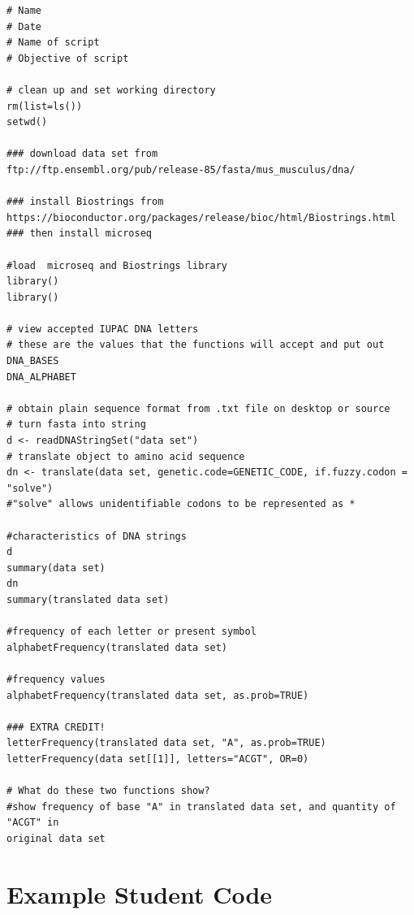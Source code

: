 \begin{lstlisting}
# Name
# Date
# Name of script
# Objective of script

# clean up and set working directory
rm(list=ls()) 
setwd()

### download data set from
ftp://ftp.ensembl.org/pub/release-85/fasta/mus_musculus/dna/

### install Biostrings from
https://bioconductor.org/packages/release/bioc/html/Biostrings.html
### then install microseq

#load  microseq and Biostrings library
library()
library()

# view accepted IUPAC DNA letters
# these are the values that the functions will accept and put out
DNA_BASES
DNA_ALPHABET

# obtain plain sequence format from .txt file on desktop or source
# turn fasta into string
d <- readDNAStringSet("data set")
# translate object to amino acid sequence
dn <- translate(data set, genetic.code=GENETIC_CODE, if.fuzzy.codon = "solve") 
#"solve" allows unidentifiable codons to be represented as *

#characteristics of DNA strings
d
summary(data set)
dn
summary(translated data set)

#frequency of each letter or present symbol
alphabetFrequency(translated data set)

#frequency values
alphabetFrequency(translated data set, as.prob=TRUE)

### EXTRA CREDIT!
letterFrequency(translated data set, "A", as.prob=TRUE)
letterFrequency(data set[[1]], letters="ACGT", OR=0)

# What do these two functions show? 
#show frequency of base "A" in translated data set, and quantity of "ACGT" in
original data set
\end{lstlisting}

\section{Example Student Code}

